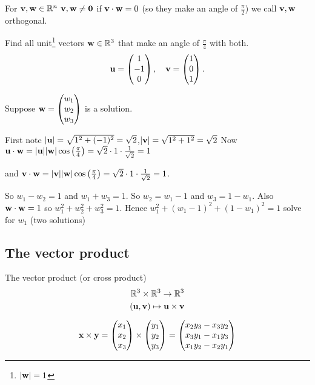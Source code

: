 \documentclass[10pt, a4paper]{article}
\begin{document}
For $\mathbf{v, w} \in \mathbb{R} ^ n$ $\mathbf{v, w \neq 0}$ if $\mathbf{v \cdot w} = 0$ (so they make an angle of $\frac{\pi}{2}$) we call $\mathbf{v, w}$ orthogonal.

\begin{example}
    Find all unit\footnote{$|\mathbf{w}| = 1$} vectors $\mathbf{w} \in \mathbb{R} ^ 3$ that make an angle of $\frac{\pi}{4}$ with both.
    \[
    \mathbf{u} = \begin{pmatrix} 1 \\ -1 \\ 0 \end{pmatrix},
    \quad\mathbf{v} = \begin{pmatrix} 1 \\ 0 \\ 1 \end{pmatrix}.
    \]

    Suppose $\mathbf{w} = \begin{pmatrix} w_1 \\ w_2 \\ w_3 \end{pmatrix}$ is a solution.

    First note $|\mathbf{u}| = \sqrt{1 ^ 2 + (-1) ^ 2} = \sqrt{2}$,\quad$|\mathbf{v}| = \sqrt{1 ^ 2 + 1 ^ 2} = \sqrt{2}$
    Now $\mathbf{u \cdot w} = |\mathbf{u}||\mathbf{w}|\cos\left(\frac{\pi}{4}\right) = \sqrt{2} \cdot 1 \cdot \frac{1}{\sqrt{2}} = 1$

    and $\mathbf{v \cdot w} = |\mathbf{v}||\mathbf{w}|\cos\left(\frac{\pi}{4}\right) = \sqrt{2} \cdot 1 \cdot \frac{1}{\sqrt{2}} = 1$.

    So $w_1 - w_2 = 1$ and $w_1 + w_3 = 1$. So $w_2 = w_1 - 1$ and $w_3 = 1 - w_1$.
    Also $\mathbf{w \cdot w} = 1$ so $w_1 ^ 2 + w_2 ^ 2 + w_3 ^ 2 = 1$.
    Hence $w_1 ^ 2 + (w_1 - 1) ^ 2 + (1 - w_1) ^ 2 = 1$
    solve for $w_1$ (two solutions)
\end{example}

\subsection{The vector product}
The vector product (or cross product)
\[
\mathbb{R} ^ 3 \times \mathbb{R} ^ 3 \rightarrow \mathbb{R} ^ 3
\]
\[
(\mathbf{u, v}) \mapsto \mathbf{u \times v}
\]

\begin{definition}
    \[
    \mathbf{x \times y} = \begin{pmatrix}
        x_1 \\ x_2 \\ x_3
    \end{pmatrix}
    \times
    \begin{pmatrix}
        y_1 \\ y_2 \\ y_3
    \end{pmatrix}
    =
    \begin{pmatrix}
        x_2 y_3 - x_3 y_2 \\
        x_3 y_1 - x_1 y_3 \\
        x_1 y_2 - x_2 y_1
    \end{pmatrix}
    \]
\end{definition}
\end{document}
